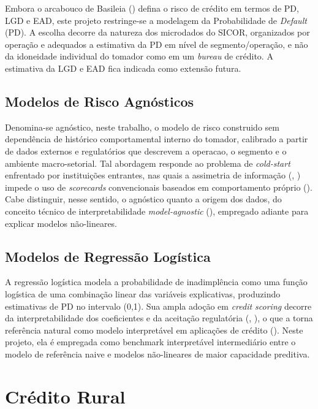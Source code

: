 Embora o arcabouco de Basileia (\cite{bcbs2004}) defina o risco de crédito em termos de PD, LGD e EAD, este projeto restringe-se a modelagem da Probabilidade de \textit{Default} (PD). A escolha decorre da natureza dos microdados do SICOR, organizados por operação e adequados a estimativa da PD em nível de segmento/operação, e não da idoneidade individual do tomador como em um \textit{bureau} de crédito. A estimativa da LGD e EAD fica indicada como extensão futura.

\subsection{Modelos de Risco Agnósticos}

Denomina-se agnóstico, neste trabalho, o modelo de risco construido sem dependência de histórico comportamental interno do tomador, calibrado a partir de dados externos e regulatórios que descrevem a operacao, o segmento e o ambiente macro-setorial. Tal abordagem responde ao problema de \textit{cold-start} enfrentado por instituições entrantes, nas quais a assimetria de informação (\cite{akerlof1970}, \cite{stiglitz1981}) impede o uso de \textit{scorecards} convencionais baseados em comportamento próprio (\cite{hand&henley1997}). Cabe distinguir, nesse sentido, o agnóstico quanto a origem dos dados, do conceito técnico de interpretabilidade \textit{model-agnostic} (\cite{lundberg&lee2017}), empregado adiante para explicar modelos não-lineares.

\subsection{Modelos de Regressão Logística}

A regressão logística modela a probabilidade de inadimplência como uma função logística de uma combinação linear das variáveis explicativas, produzindo estimativas de PD no intervalo (0,1). Sua ampla adoção em \textit{credit scoring} decorre da interpretabilidade dos coeficientes e da aceitação regulatória (\cite{hand&henley1997}, \cite{thomasetal2002}), o que a torna referência natural como modelo interpretável em aplicações de crédito (\cite{siddiqi2006}). Neste projeto, ela é empregada como benchmark interpretável intermediário entre o modelo de referência naive e modelos não-lineares de maior capacidade preditiva.

\section{Crédito Rural}

